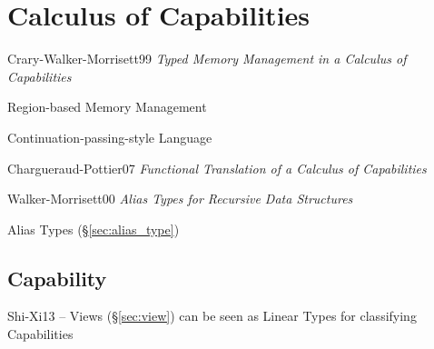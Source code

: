 \section{Calculus of Capabilities}\label{sec:capabilities_calculus}

Crary-Walker-Morrisett99 \emph{Typed Memory Management in a Calculus
  of Capabilities}

Region-based Memory Management

Continuation-passing-style Language

Chargueraud-Pottier07 \emph{Functional Translation of a Calculus of
  Capabilities}

Walker-Morrisett00 \emph{Alias Types for Recursive Data Structures}

Alias Types (\S\ref{sec:alias_type})



\subsection{Capability}\label{sec:capability}

Shi-Xi13 -- Views (\S\ref{sec:view}) can be seen as Linear Types for
classifying Capabilities
